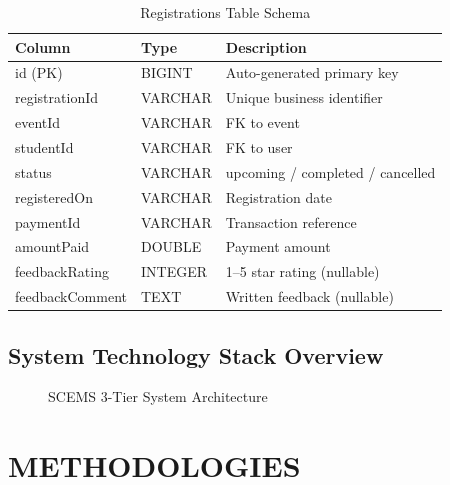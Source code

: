 \begin{table}[H]
\centering
\caption{Registrations Table Schema}
\label{tab:registrations_schema}
\begin{tabular}{|l|l|l|}
\hline
\textbf{Column} & \textbf{Type} & \textbf{Description} \\
\hline
id (PK) & BIGINT & Auto-generated primary key \\
\hline
registrationId & VARCHAR & Unique business identifier \\
\hline
eventId & VARCHAR & FK to event \\
\hline
studentId & VARCHAR & FK to user \\
\hline
status & VARCHAR & upcoming / completed / cancelled \\
\hline
registeredOn & VARCHAR & Registration date \\
\hline
paymentId & VARCHAR & Transaction reference \\
\hline
amountPaid & DOUBLE & Payment amount \\
\hline
feedbackRating & INTEGER & 1--5 star rating (nullable) \\
\hline
feedbackComment & TEXT & Written feedback (nullable) \\
\hline
\end{tabular}
\end{table}

\section{System Technology Stack Overview}

\begin{figure}[H]
\centering
\caption{SCEMS 3-Tier System Architecture}
\label{fig:system_arch}
\end{figure}

\chapter{METHODOLOGIES}

